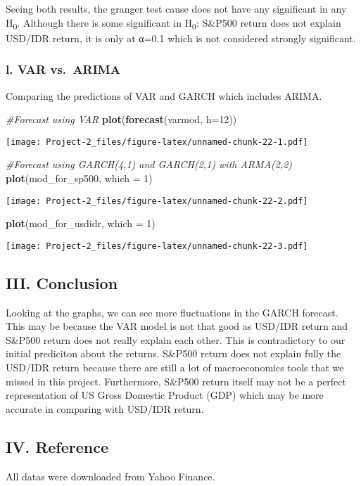 \documentclass[]{article}
\newenvironment{Shaded}{\begin{snugshade}}{\end{snugshade}}
\newcommand{\KeywordTok}[1]{\textcolor[rgb]{0.13,0.29,0.53}{\textbf{#1}}}
\newcommand{\DataTypeTok}[1]{\textcolor[rgb]{0.13,0.29,0.53}{#1}}
\newcommand{\DecValTok}[1]{\textcolor[rgb]{0.00,0.00,0.81}{#1}}
\newcommand{\CommentTok}[1]{\textcolor[rgb]{0.56,0.35,0.01}{\textit{#1}}}
\newcommand{\NormalTok}[1]{#1}
\begin{document}
Seeing both results, the granger test cause does not have any
significant in any H\textsubscript{0}. Although there is some
significant in H\textsubscript{0}: S\&P500 return does not explain
USD/IDR return, it is only at α=0.1 which is not considered strongly
significant.

\subsubsection{l. VAR vs.~ARIMA}\label{l.-var-vs.arima}

Comparing the predictions of VAR and GARCH which includes ARIMA.

\begin{Shaded}
\begin{Highlighting}[]
\CommentTok{#Forecast using VAR}
\KeywordTok{plot}\NormalTok{(}\KeywordTok{forecast}\NormalTok{(varmod, }\DataTypeTok{h=}\DecValTok{12}\NormalTok{))}
\end{Highlighting}
\end{Shaded}

\texttt{[image: Project-2\_files/figure-latex/unnamed-chunk-22-1.pdf]}

\begin{Shaded}
\begin{Highlighting}[]
\CommentTok{#Forecast using GARCH(4,1) and GARCH(2,1) with ARMA(2,2)}
\KeywordTok{plot}\NormalTok{(mod_for_sp500, }\DataTypeTok{which =} \DecValTok{1}\NormalTok{)}
\end{Highlighting}
\end{Shaded}

\texttt{[image: Project-2\_files/figure-latex/unnamed-chunk-22-2.pdf]}

\begin{Shaded}
\begin{Highlighting}[]
\KeywordTok{plot}\NormalTok{(mod_for_usdidr, }\DataTypeTok{which =} \DecValTok{1}\NormalTok{)}
\end{Highlighting}
\end{Shaded}

\texttt{[image: Project-2\_files/figure-latex/unnamed-chunk-22-3.pdf]}

\subsection{III. Conclusion}\label{iii.-conclusion}

Looking at the graphs, we can see more fluctuations in the GARCH
forecast. This may be because the VAR model is not that good as USD/IDR
return and S\&P500 return does not really explain each other. This is
contradictory to our initial prediciton about the returns. S\&P500
return does not explain fully the USD/IDR return because there are still
a lot of macroeconomics tools that we missed in this project.
Furthermore, S\&P500 return itself may not be a perfect representation
of US Gross Domestic Product (GDP) which may be more accurate in
comparing with USD/IDR return.

\subsection{IV. Reference}\label{iv.-reference}

All datas were downloaded from Yahoo Finance.
\end{document}
